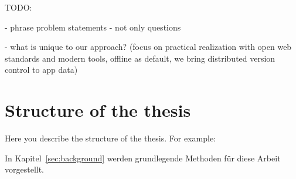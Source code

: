TODO:

- phrase problem statements - not only questions

- what is unique to our approach? (focus on practical realization with open web standards and modern tools, offline as default, we bring distributed version control to app data)

\section{Structure of the thesis}
Here you describe the structure of the thesis. For example:

In Kapitel~\ref{sec:background} werden grundlegende Methoden für diese Arbeit vorgestellt.